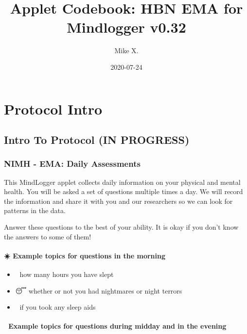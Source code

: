 \documentclass[]{book}
\title{Applet Codebook: HBN EMA for Mindlogger v0.32}
\author{Mike X.}
\date{2020-07-24}
\providecommand{\tightlist}{%
  \setlength{\itemsep}{0pt}\setlength{\parskip}{0pt}}
\begin{document}
\maketitle

{
\setcounter{tocdepth}{1}
\tableofcontents
}
\hypertarget{part-protocol-intro}{%
\part{Protocol Intro}\label{part-protocol-intro}}

\hypertarget{intro}{%
\chapter*{Intro To Protocol (IN PROGRESS)}\label{intro}}

\hypertarget{nimh---ema-daily-assessments}{%
\section{NIMH - EMA: Daily Assessments}\label{nimh---ema-daily-assessments}}

This MindLogger applet collects daily information on your physical and mental health.
You will be asked a set of questions multiple times a day. We will record the information and share it with you and our researchers so we can look for patterns in the data.

Answer these questions to the best of your ability. It is okay if you don't know the answers to some of them!

\hypertarget{example-topics-for-questions-in-the-morning}{%
\subsection{☀️ Example topics for questions in the morning}\label{example-topics-for-questions-in-the-morning}}

\begin{itemize}
\tightlist
\item
  🛌 how many hours you have slept
\item
  😴 whether or not you had nightmares or night terrors
\item
  💊 if you took any sleep aids
\end{itemize}

\hypertarget{example-topics-for-questions-during-midday-and-in-the-evening}{%
\subsection{🌙 Example topics for questions during midday and in the evening}\label{example-topics-for-questions-during-midday-and-in-the-evening}}
\end{document}
